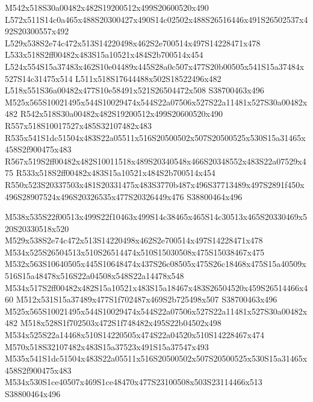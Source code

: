 \documentclass{article}
\begin{document}
\begin{multicols}{2}
M542x518S30a00482x482S19200512x499S20600520x490 L572x511S14c0a465x488S20300427x490S14c02502x488S26516446x491S26502537x492S20300557x492 L529x538S2e74c472x513S14220498x462S2e700514x497S14228471x478 L533x518S2ff00482x483S15a10521x484S2b700514x454 L524x554S15a37483x462S10e04489x445S28a0c507x477S20b00505x541S15a37484x527S14c31475x514 L511x518S17644488x502S18522496x482 L518x551S36a00482x477S10e58491x521S26504472x508 S38700463x496 M525x565S10021495x544S10029474x544S22a07506x527S22a11481x527S30a00482x482 R542x518S30a00482x482S19200512x499S20600520x490 R557x518S10017527x485S32107482x483 R535x541S1dc51504x483S22a05511x516S20500502x507S20500525x530S15a31465x458S2f900475x483 R567x519S2ff00482x482S10011518x489S20340548x466S20348552x483S22a07529x475 R533x518S2ff00482x483S15a10521x484S2b700514x454 R550x523S20337503x481S20331475x483S3770b487x496S37713489x497S2891f450x496S28907524x496S20326535x477S20326449x476 S38800464x496

M538x535S22f00513x499S22f10463x499S14c38465x465S14c30513x465S20330469x520S20330518x520 M529x538S2e74c472x513S14220498x462S2e700514x497S14228471x478 M534x525S26504513x510S26514474x510S15030508x475S15038467x475 M532x563S10640505x445S10648474x437S26c08505x475S26c18468x475S15a40509x516S15a48478x516S22a04508x548S22a14478x548 M534x517S2ff00482x482S15a10521x483S15a18467x483S26504520x459S26514466x460 M512x531S15a37489x477S1f702487x469S2b725498x507 S38700463x496 M525x565S10021495x544S10029474x544S22a07506x527S22a11481x527S30a00482x482 M518x528S1f702503x472S1f748482x495S22b04502x498 M534x525S22a14468x510S14220505x474S22a04520x510S14228467x474 M570x518S32107482x483S15a37523x491S15a37547x493 M535x541S1dc51504x483S22a05511x516S20500502x507S20500525x530S15a31465x458S2f900475x483 M534x530S1ce40507x469S1ce48470x477S23100508x503S23114466x513 S38800464x496


\end{multicols}
\end{document}
